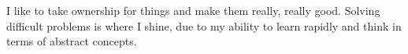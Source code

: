\documentclass[9pt]{developercv} %
\begin{document}
\vspace{0.5cm}



\begin{minipage}[t]{0.4\textwidth} %
	\vspace{-\baselineskip} %
	
    I like to take ownership for things and make them really, really good. Solving difficult problems is where I shine, due to my ability to learn rapidly and think in terms of abstract concepts.
\end{minipage}
\hfill %
\begin{minipage}[t]{0.5\textwidth} %
	\vspace{-\baselineskip} %
	\begin{barchart}{5.5}
	\end{barchart}
\end{minipage}



\end{document}
